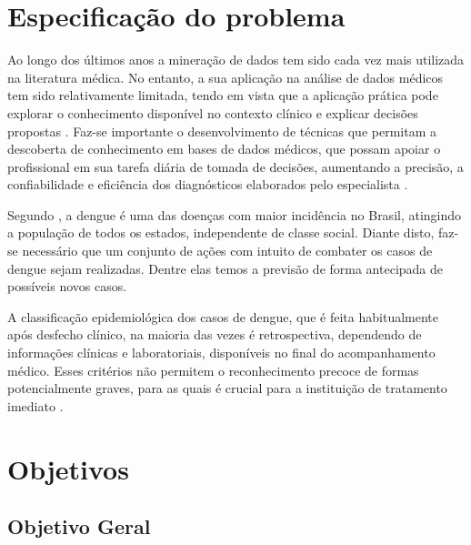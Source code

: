 \documentclass[
	12pt,				%
	openright,			%
	oneside,	
	a4paper,				%
	english,				%
	brazil				%
]{abntex2/abntex2} %
\begin{document}
    \newpage
	\section{Especificação do problema}
		
		Ao longo dos últimos anos a mineração de dados tem sido cada vez mais utilizada na literatura médica. No entanto, a sua aplicação na análise de dados médicos tem sido relativamente limitada, tendo em vista que a aplicação prática pode explorar o conhecimento disponível no contexto clínico e explicar decisões propostas \cite{bellazzi:2008}. Faz-se importante o desenvolvimento de técnicas que permitam a descoberta de conhecimento em bases de dados médicos, que possam apoiar o profissional em sua tarefa diária de tomada de decisões, aumentando a precisão, a confiabilidade e eficiência dos diagnósticos elaborados pelo especialista \cite{costa:2012}.
		
		Segundo \cite{saude:2013}, a dengue é uma das doenças com maior incidência no Brasil, atingindo a população de todos os estados, independente de classe social. Diante disto, faz-se necessário que um conjunto de ações com intuito de combater os casos de dengue sejam realizadas. Dentre elas temos a previsão de forma antecipada de possíveis novos casos.

		A classificação epidemiológica dos casos de dengue, que é feita habitualmente após desfecho clínico, na maioria das vezes é retrospectiva, dependendo de informações clínicas e laboratoriais, disponíveis no final do acompanhamento médico. Esses critérios não permitem o reconhecimento precoce de formas potencialmente graves, para as quais é crucial para a instituição de tratamento imediato \cite{saude:2013}.

	\section{Objetivos}
	
		\subsection{Objetivo Geral}
\end{document}

